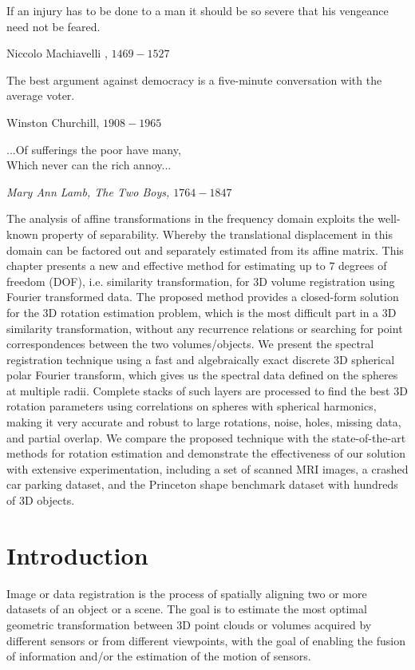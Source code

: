 \documentclass{UCF_ETD}
\begin{document}
\epigraph{If an injury has to be done to a man it should be so severe that his vengeance need not be feared.}{Niccolo Machiavelli , $1469 - 1527$ }

\epigraph{The best argument against democracy is a five-minute conversation with the average voter.}{Winston Churchill, $1908-1965$ }

\epigraph{...Of sufferings the poor have many,\\
 Which never can the rich annoy... }{\itshape Mary Ann Lamb, The Two Boys, $1764 - 1847$}


The analysis of affine transformations in the frequency domain exploits the well-known property of separability. Whereby the translational displacement in this domain can be factored out and separately estimated from its affine matrix. This chapter presents a new and effective method for estimating up to $7$ degrees of freedom (DOF),  i.e. similarity transformation, for $3$D volume registration using Fourier transformed data. The proposed method provides a closed-form solution for the $3$D rotation estimation problem, which is the most difficult part in a $3$D similarity transformation,  without any recurrence relations or searching for point correspondences between the two volumes/objects. We present the spectral registration technique using a fast and algebraically exact discrete $3$D spherical polar Fourier transform, which gives us the spectral data defined on the spheres at multiple radii. Complete stacks of such layers are processed to find the best $3$D rotation parameters using correlations on spheres with spherical harmonics, making it very accurate and robust to large rotations, noise, holes, missing data, and partial overlap. We compare the proposed technique with the state-of-the-art methods for rotation estimation and demonstrate the effectiveness of our solution with extensive experimentation, including a set of scanned MRI images, a crashed car parking dataset, and the Princeton shape benchmark dataset with hundreds of $3$D objects.

\section{Introduction} \label{intro}
Image or data registration is the process of spatially aligning two or more datasets of an object or a scene. The goal is to estimate the most optimal geometric transformation between $3$D point clouds or volumes acquired by different sensors or from different viewpoints, with the goal of enabling the fusion of information and/or the estimation of the motion of sensors.
\end{document}
